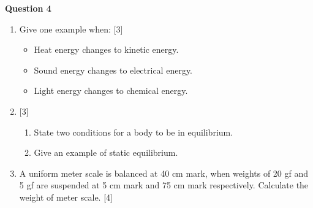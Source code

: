 \newpage
\noindent
\textbf{Question 4}
\begin{enumerate}[label=(\roman*)]

    \item Give one example when: \hfill [3]
        \begin{itemize}
            \setlength\itemsep{0em}
            \item Heat energy changes to kinetic energy.
            \item Sound energy changes to electrical energy.
            \item Light energy changes to chemical energy.
        \end{itemize}

    \item \hfill [3]
        \begin{enumerate}[label=(\alph*)]
            \item State two conditions for a body to be in equilibrium.
            \item Give an example of static equilibrium.
        \end{enumerate}

    \item A uniform meter scale is balanced at 40 cm mark, when 
        weights of 20 gf and 5 gf are suspended at 5 cm mark and 
        75 cm mark respectively. Calculate the weight of meter 
        scale. \hfill [4]

\end{enumerate}

